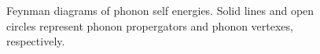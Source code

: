 \begin{figure}[t]
\centering
\begin{minipage}[b]{0.45\linewidth}
\centering
{}
\end{minipage}
\begin{minipage}[b]{0.45\linewidth}
\centering
{}
\end{minipage}

\begin{minipage}[b]{0.45\linewidth}
\centering
{}
\end{minipage}
\begin{minipage}[b]{0.45\linewidth}
\centering
{}
\end{minipage}
\caption{Feynman diagrams of phonon self energies. Solid lines and open circles represent phonon propergators and phonon vertexes, respectively.}
\label{fig:diagram}
\end{figure}